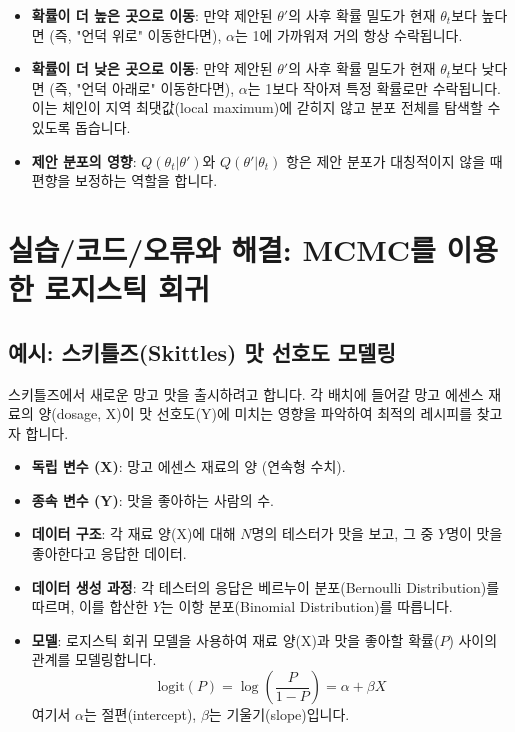 \documentclass[11pt,a4paper]{book}
\providecommand{\newsection}{\section}
\theoremstyle{definition}
\begin{document}
\begin{infobox}[title=수락 확률 $\alpha$의 직관적 의미]
\begin{itemize}
    \item \textbf{확률이 더 높은 곳으로 이동}: 만약 제안된 $\theta'$의 사후 확률 밀도가 현재 $\theta_t$보다 높다면 (즉, "언덕 위로" 이동한다면), $\alpha$는 1에 가까워져 거의 항상 수락됩니다.
    \item \textbf{확률이 더 낮은 곳으로 이동}: 만약 제안된 $\theta'$의 사후 확률 밀도가 현재 $\theta_t$보다 낮다면 (즉, "언덕 아래로" 이동한다면), $\alpha$는 1보다 작아져 특정 확률로만 수락됩니다. 이는 체인이 지역 최댓값(local maximum)에 갇히지 않고 분포 전체를 탐색할 수 있도록 돕습니다.
    \item \textbf{제안 분포의 영향}: $Q(\theta_t | \theta')$와 $Q(\theta' | \theta_t)$ 항은 제안 분포가 대칭적이지 않을 때 편향을 보정하는 역할을 합니다.
\end{itemize}
\end{infobox}

\newsection{실습/코드/오류와 해결: MCMC를 이용한 로지스틱 회귀}

\subsection*{예시: 스키틀즈(Skittles) 맛 선호도 모델링}
스키틀즈에서 새로운 망고 맛을 출시하려고 합니다. 각 배치에 들어갈 망고 에센스 재료의 양(dosage, X)이 맛 선호도(Y)에 미치는 영향을 파악하여 최적의 레시피를 찾고자 합니다.

\begin{infobox}[title=데이터 및 모델 설정]
\begin{itemize}
    \item \textbf{독립 변수 (X)}: 망고 에센스 재료의 양 (연속형 수치).
    \item \textbf{종속 변수 (Y)}: 맛을 좋아하는 사람의 수.
    \item \textbf{데이터 구조}: 각 재료 양(X)에 대해 $N$명의 테스터가 맛을 보고, 그 중 $Y$명이 맛을 좋아한다고 응답한 데이터.
    \item \textbf{데이터 생성 과정}: 각 테스터의 응답은 베르누이 분포(Bernoulli Distribution)를 따르며, 이를 합산한 $Y$는 이항 분포(Binomial Distribution)를 따릅니다.
    \item \textbf{모델}: 로지스틱 회귀 모델을 사용하여 재료 양(X)과 맛을 좋아할 확률($P$) 사이의 관계를 모델링합니다.
    \[ \text{logit}(P) = \log\left(\frac{P}{1-P}\right) = \alpha + \beta X \]
    여기서 $\alpha$는 절편(intercept), $\beta$는 기울기(slope)입니다.
\end{itemize}
\end{infobox}
\end{document}
